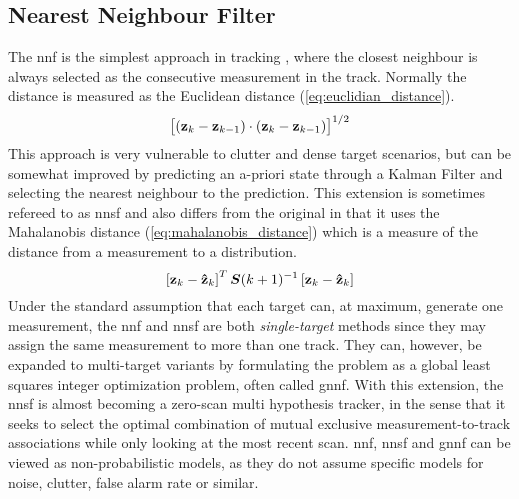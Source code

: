 \subsection{Nearest Neighbour Filter}
\label{sec:nn}
The \gls{nnf} is the simplest approach in tracking \cite{Bar-Shalom1998}, where the closest neighbour is always selected as the consecutive \gls{measurement} in the track. Normally the distance is measured as the Euclidean distance (\ref{eq:euclidian_distance}).
\begin{equation}
\left[ (\boldsymbol{\mathbf{z}}_k-\boldsymbol{\mathbf{z}}_{k-1}) \cdot (\boldsymbol{\mathbf{z}}_k-\boldsymbol{\mathbf{z}}_{k-1}) \right]^{1/2}
\label{eq:euclidian_distance}
\end{equation}
This approach is very vulnerable to clutter and dense \gls{target} scenarios, but can be somewhat improved by predicting an a-priori state through a Kalman Filter and selecting the nearest neighbour to the prediction. This extension is sometimes refereed to as \gls{nnsf} \cite{Bar-Shalom1998} and also differs from the original in that it uses the Mahalanobis distance (\ref{eq:mahalanobis_distance}) which is a measure of the distance from a \gls{measurement} to a distribution.
\begin{equation}
\left[ \boldsymbol{\mathbf{z}}_k - \boldsymbol{\mathbf{\hat{z}}}_{k} \right]^T \bm{S}(k+1)^{-1} \left[ \boldsymbol{\mathbf{z}}_k - \boldsymbol{\mathbf{\hat{z}}}_{k} \right]
\label{eq:mahalanobis_distance}
\end{equation}
Under the standard assumption that each \gls{target} can, at maximum, generate one \gls{measurement}, the \gls{nnf} and \gls{nnsf} are both \emph{single-\gls{target}} methods since they may assign the same \gls{measurement} to more than one track. They can, however, be expanded to multi-\gls{target} variants by formulating the problem as a global least squares integer optimization problem, often called \gls{gnnf}. With this extension, the \gls{nnsf} is almost becoming a zero-scan multi hypothesis tracker, in the sense that it seeks to select the optimal combination of mutual exclusive measurement-to-track associations while only looking at the most recent \gls{scan}. \gls{nnf}, \gls{nnsf} and \gls{gnnf} can be viewed as non-probabilistic models, as they do not assume specific models for noise, clutter, false alarm rate or similar.

